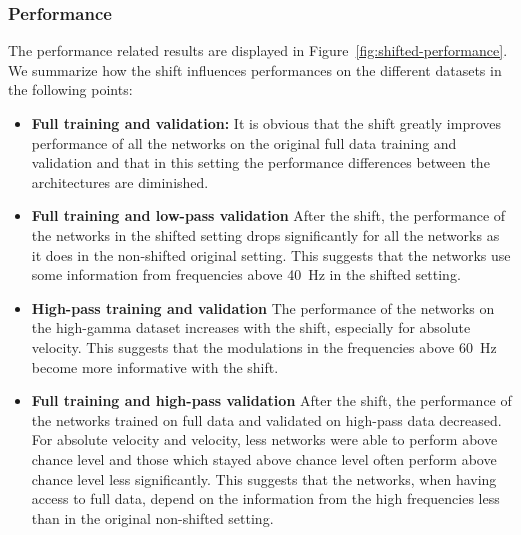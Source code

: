 \subsubsection{Performance}
The performance related results are displayed in Figure~\ref{fig:shifted-performance}.
We summarize how the shift influences performances on the different datasets in the following points:
\begin{itemize}
    \item \textbf{Full training and validation:} It is obvious that the shift greatly improves performance of all the networks on the original full data training and validation and that in this setting the performance differences between the architectures are diminished.
    
    
    \item \textbf{Full training and low-pass validation} After the shift, the performance of the networks in the shifted setting drops significantly for all the networks as it does in the non-shifted original setting. This suggests that the networks use some information from frequencies above 40~Hz in the shifted setting.
    
    \item \textbf{High-pass training and validation} The performance of the networks on the high-gamma dataset increases with the shift, especially for absolute velocity. This suggests that the modulations in the frequencies above 60~Hz become more informative with the shift.
    
    \item \textbf{Full training and high-pass validation} After the shift, the performance of the networks trained on full data and validated on high-pass data decreased. For absolute velocity and velocity, less networks were able to perform above chance level and those which stayed above chance level often perform above chance level less significantly. This suggests that the networks, when having access to full data, depend on the information from the high frequencies less than in the original non-shifted setting.

\end{itemize}


